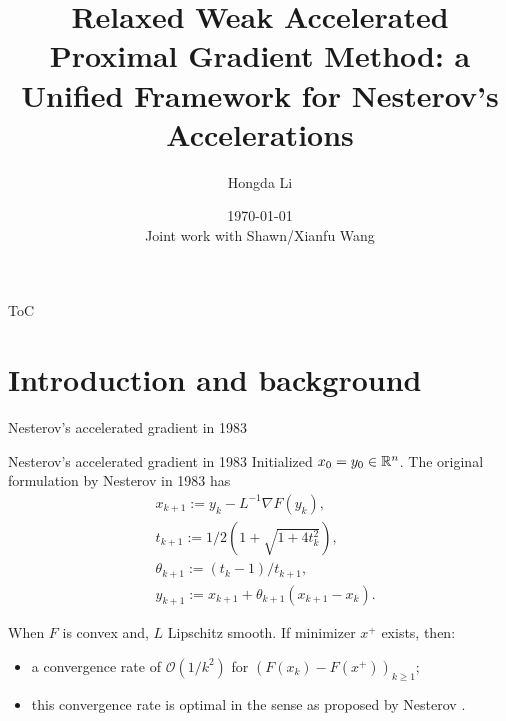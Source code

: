 \documentclass[11pt]{beamer}
\author[Hongda Li]{Hongda Li}
\title{
    Relaxed Weak Accelerated Proximal Gradient Method: a Unified Framework for Nesterov's Accelerations
}
\institute[UBCO]{
    University of British Columbia Okanagan
    \\
    WCOM 2025
}
\date[\today]{
    \today \\ \vspace{1cm} 
    \tiny{Joint work with Shawn/Xianfu Wang}\\ 
}
\theoremstyle{definition}
\begin{document}
\begin{frame}
    \titlepage
\end{frame}

\begin{frame}{ToC}
    \tableofcontents
\end{frame}

\section{Introduction and background}
    \begin{frame}{Nesterov's accelerated gradient in 1983}
        \begin{block}{Nesterov's accelerated gradient in 1983}
            Initialized $x_0 = y_0 \in \mathbb R^n$. 
            The original formulation by Nesterov in 1983 \cite{nesterov_method_1983} has
            {\small
            \begin{align*}
                & x_{k + 1} := y_k - L^{-1}\nabla F(y_k),
                \\
                & t_{k + 1} := 1/2\left(1 + \sqrt{1 + 4t_{k}^2}\right),
                \\
                & \theta_{k + 1} := (t_{k} - 1)/t_{k + 1}, \label{eqn:example-algorithm}
                \\
                & y_{k + 1} := x_{k + 1} + \theta_{k + 1}(x_{k + 1} - x_k).
            \end{align*}    
            }
        \end{block}
        When $F$ is convex and, $L$ Lipschitz smooth. 
        If minimizer $x^+$ exists, then: 
        \begin{itemize}
            \item a convergence rate of $\mathcal O(1/k^2)$ for $(F(x_k) - F(x^+))_{k \ge 1}$;
            \item this convergence rate is optimal in the sense as proposed by Nesterov \cite{nesterov_lectures_2018}.
        \end{itemize}
    \end{frame}
\end{document}
